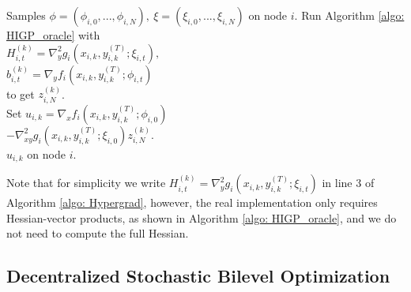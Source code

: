 \documentclass{article}
\theoremstyle{plain}
\theoremstyle{definition}
\theoremstyle{remark}
\begin{document}
\begin{algorithm}[ht]
    \begin{algorithmic}[1]
        \caption{Hypergradient Estimation}\label{algo: Hypergrad}
         Samples $\phi = (\phi_{i,0},...,\phi_{i,N}),\ \xi = (\xi_{i,0}, ..., \xi_{i,N})$ on node $i$.
            \STATE Run Algorithm \ref{algo: HIGP_oracle} with \\
            \STATE $H_{i,t}^{(k)} = \nabla_y^2g_i(x_{i,k},y_{i,k}^{(T)};\xi_{i,t}),$ \\ \STATE $b_{i,t}^{(k)} = \nabla_{y}f_i(x_{i,k},y_{i,k}^{(T)};\phi_{i,t})$ \\
            \STATE to get $z_{i,N}^{(k)}$. \\
            \STATE Set $u_{i,k} = \nabla_x f_i(x_{i,k},y_{i,k}^{(T)};\phi_{i,0})$ \\
            \STATE \qquad\qquad $-\nabla_{xy}^2 g_i(x_{i,k},y_{i,k}^{(T)};\xi_{i,0} )z_{i,N}^{(k)}$. \\
         $u_{i,k}$ on node $i$.
    \end{algorithmic}
\end{algorithm}

Note that for simplicity we write $H_{i,t}^{(k)}=\nabla_y^2g_i(x_{i,k},y_{i,k}^{(T)};\xi_{i,t})$ in line 3 of Algorithm \ref{algo: Hypergrad}, however, the real implementation only requires Hessian-vector products, as shown in Algorithm \ref{algo: HIGP_oracle}, and we do not need to compute the full Hessian.



\subsection{Decentralized Stochastic Bilevel Optimization}
\end{document}
